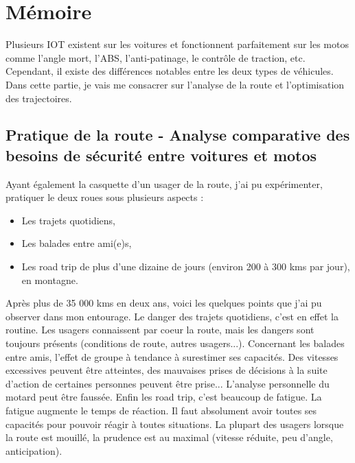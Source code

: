 \section{Mémoire}

Plusieurs IOT existent sur les voitures et fonctionnent parfaitement sur les motos comme l'angle mort, l'ABS, l'anti-patinage, le contrôle de traction, etc. Cependant, il existe des différences notables entre les deux types de véhicules. Dans cette partie, je vais me consacrer sur l'analyse de la route et l'optimisation des trajectoires.


\subsection{Pratique de la route - Analyse comparative des besoins de sécurité entre voitures et motos}


Ayant également la casquette d'un usager de la route, j'ai pu expérimenter, pratiquer le deux roues sous plusieurs aspects : \
\begin{itemize}
    \item Les trajets quotidiens,
    \item Les balades entre ami(e)s,
    \item Les road trip de plus d'une dizaine de jours (environ 200 à 300 kms par jour), en montagne.
\end{itemize}

Après plus de 35 000 kms en deux ans, voici les quelques points que j'ai pu observer dans mon entourage.
Le danger des trajets quotidiens, c'est en effet la routine. Les usagers connaissent par coeur la route, mais les dangers sont toujours présents (conditions de route, autres usagers...).
Concernant les balades entre amis, l'effet de groupe à tendance à surestimer ses capacités. Des vitesses excessives peuvent être atteintes, des mauvaises prises de décisions à la suite d'action de certaines personnes peuvent être prise... L'analyse personnelle du motard peut être faussée.
Enfin les road trip, c'est beaucoup de fatigue. La fatigue augmente le temps de réaction. Il faut absolument avoir toutes ses capacités pour pouvoir réagir à toutes situations.
La plupart des usagers lorsque la route est mouillé, la prudence est au maximal (vitesse réduite, peu d'angle, anticipation).


